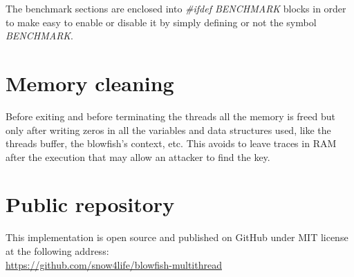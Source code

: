 The benchmark sections are enclosed into \emph{\#ifdef BENCHMARK} blocks in order to make easy to enable or disable it by simply defining or not the symbol \emph{BENCHMARK}.

\section{Memory cleaning}
Before exiting and before terminating the threads all the memory is freed but only after writing zeros in all the variables and data structures used, like the threads buffer, the blowfish's context, etc. This avoids to leave traces in RAM after the execution that may allow an attacker to find the key.


\section{Public repository}
This implementation is open source and published on GitHub under MIT license at the following address:\\

\url{https://github.com/snow4life/blowfish-multithread}

